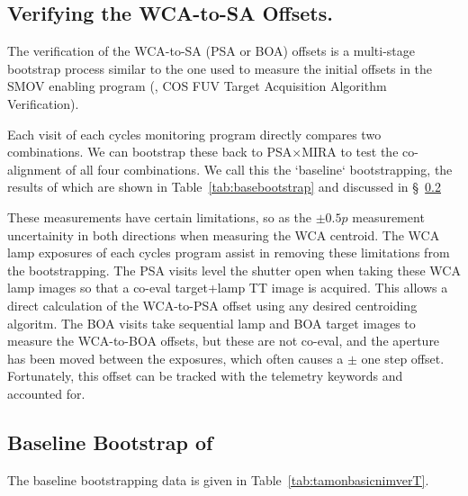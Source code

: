 
\subsection{Verifying the  WCA-to-SA Offsets.}\label{subsec:WCA2SAVER}

The verification of the  WCA-to-SA (PSA or BOA) offsets is a multi-stage bootstrap
process similar to the one used to measure the initial offsets in the SMOV enabling program (, COS FUV Target Acquisition Algorithm Verification).

Each visit of each cycles monitoring program directly compares two  combinations.
We can bootstrap these back to PSA$\times$MIRA to test the co-alignment of all four combinations.
We call this the `baseline` bootstrapping, the results of which are shown in Table~\ref{tab:basebootstrap}
and discussed in \S~\ref{subsec:basebootstrap}

These measurements have certain limitations, so as the $\pm 0.5p$ measurement uncertainity in both directions
when measuring the WCA centroid. The WCA lamp exposures of each cycles program assist in removing
these limitations from the bootstrapping. The PSA  visits level the shutter open when
taking these WCA lamp images so that a co-eval target+lamp TT image is acquired. This allows a direct
calculation of the WCA-to-PSA offset using any desired centroiding algoritm. The BOA  visits
take sequential lamp and BOA target images to measure the WCA-to-BOA offsets, but these are not co-eval,
and the aperture has been moved between the exposures, which often causes a $\pm$ one step offset.
Fortunately, this offset can be tracked with the telemetry keywords and accounted for.


\subsection{Baseline Bootstrap of }\label{subsec:basebootstrap}

The baseline bootstrapping data is given in Table~\ref{tab:tamonbasicnimverT}.




